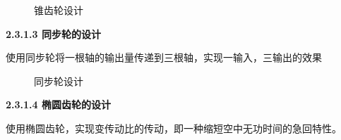 \documentclass[12pt]{article}
\begin{document}
\begin{CJK}{UTF8}{song}
\begin{figure}[H]
\quad
\caption{锥齿轮设计}
\end{figure}
\textbf{2.3.1.3 同步轮的设计}\par
 使用同步轮将一根轴的输出量传递到三根轴，实现一输入，三输出的效果
 \begin{figure}[H]
{}
\quad
{}
\quad
\caption{同步轮设计}
\end{figure}
\textbf{2.3.1.4 椭圆齿轮的设计}\par
 使用椭圆齿轮，实现变传动比的传动，即一种缩短空中无功时间的急回特性。
 \begin{figure}[H]
{}
\end{figure}
\end{CJK}
\end{document}
